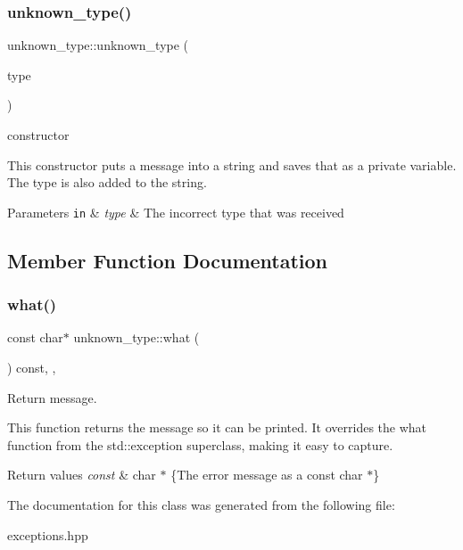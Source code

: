 \subsubsection{\texorpdfstring{unknown\+\_\+type()}{unknown\_type()}}
{\footnotesize\ttfamily unknown\+\_\+type\+::unknown\+\_\+type (\begin{DoxyParamCaption}\item[{const std\+::string}]{type }\end{DoxyParamCaption})\hspace{0.3cm}{\ttfamily [inline]}}



constructor 

This constructor puts a message into a string and saves that as a private variable. The type is also added to the string.


\begin{DoxyParams}[1]{Parameters}
\mbox{\tt in}  & {\em type} & The incorrect type that was received \\
\hline
\end{DoxyParams}


\subsection{Member Function Documentation}
\mbox{\label{classunknown__type_a95f8c551c7bf001353d4a68b6874650d}} 
\subsubsection{\texorpdfstring{what()}{what()}}
{\footnotesize\ttfamily const char$\ast$ unknown\+\_\+type\+::what (\begin{DoxyParamCaption}{ }\end{DoxyParamCaption}) const\hspace{0.3cm}{\ttfamily [inline]}, {\ttfamily [override]}, {\ttfamily [noexcept]}}



Return message. 

This function returns the message so it can be printed. It overrides the what function from the std\+::exception superclass, making it easy to capture.


\begin{DoxyRetVals}{Return values}
{\em const} & char $\ast$ \{The error message as a const char $\ast$\} \\
\hline
\end{DoxyRetVals}


The documentation for this class was generated from the following file\+:\begin{DoxyCompactItemize}
\item 
exceptions.\+hpp\end{DoxyCompactItemize}
